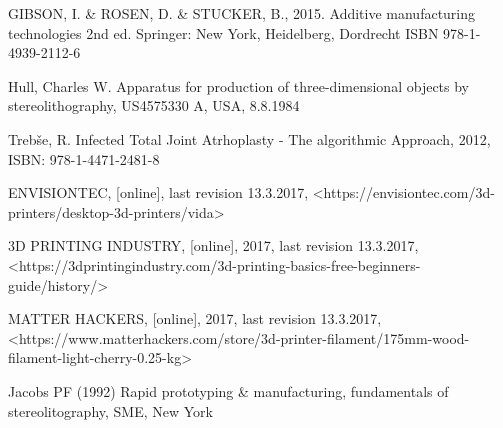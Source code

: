\documentclass[a4paper, twoside, 11pt]{report}
\begin{document}
\tableofcontents
\listoftodos

\begin{thebibliography}{99}
	GIBSON, I. \& ROSEN, D. \& STUCKER, B.,
	2015.
	Additive manufacturing technologies
	2nd ed.
	Springer:
	New York, Heidelberg, Dordrecht
	ISBN 978-1-4939-2112-6
	
	Hull, Charles W.
	Apparatus for production of three-dimensional objects by stereolithography,
	US4575330 A,
	USA,
	8.8.1984
	
	Trebše, R.
	Infected Total Joint Atrhoplasty - The algorithmic Approach,
	2012,
	ISBN: 978-1-4471-2481-8
	
	ENVISIONTEC,
	[online],
	last revision 13.3.2017,
	<https://envisiontec.com/3d-printers/desktop-3d-printers/vida>
	
	3D PRINTING INDUSTRY,
	[online],
	2017,
	last revision 13.3.2017,
	<https://3dprintingindustry.com/3d-printing-basics-free-beginners-guide/history/>
	
	MATTER HACKERS,
	[online],
	2017,
	last revision 13.3.2017,
	<https://www.matterhackers.com/store/3d-printer-filament/175mm-wood-filament-light-cherry-0.25-kg>
	
	Jacobs PF (1992)
	Rapid prototyping \& manufacturing,
	fundamentals of stereolitography,
	SME,
	New York
	
\end{thebibliography}
\end{document}
